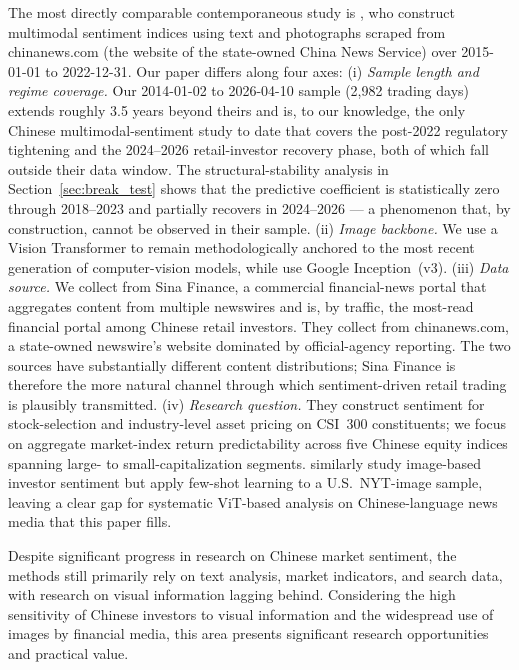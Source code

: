 \documentclass[AER]{AEA}
\begin{document}
The most directly comparable contemporaneous study is \citet{zhang2025multimodal}, who construct multimodal sentiment indices using text and photographs scraped from chinanews.com (the website of the state-owned China News Service) over 2015-01-01 to 2022-12-31. Our paper differs along four axes:
(i) \emph{Sample length and regime coverage.} Our 2014-01-02 to 2026-04-10 sample (2{,}982 trading days) extends roughly 3.5 years beyond theirs and is, to our knowledge, the only Chinese multimodal-sentiment study to date that covers the post-2022 regulatory tightening and the 2024--2026 retail-investor recovery phase, both of which fall outside their data window. The structural-stability analysis in Section~\ref{sec:break_test} shows that the predictive coefficient is statistically zero through 2018--2023 and partially recovers in 2024--2026 --- a phenomenon that, by construction, cannot be observed in their sample.
(ii) \emph{Image backbone.} We use a Vision Transformer to remain methodologically anchored to the most recent generation of computer-vision models, while \citet{zhang2025multimodal} use Google Inception~(v3).
(iii) \emph{Data source.} We collect from Sina Finance, a commercial financial-news portal that aggregates content from multiple newswires and is, by traffic, the most-read financial portal among Chinese retail investors. They collect from chinanews.com, a state-owned newswire's website dominated by official-agency reporting. The two sources have substantially different content distributions; Sina Finance is therefore the more natural channel through which sentiment-driven retail trading is plausibly transmitted.
(iv) \emph{Research question.} They construct sentiment for stock-selection and industry-level asset pricing on CSI~300 constituents; we focus on aggregate market-index return predictability across five Chinese equity indices spanning large- to small-capitalization segments.
\citet{ren2025investor} similarly study image-based investor sentiment but apply few-shot learning to a U.S.\ NYT-image sample, leaving a clear gap for systematic ViT-based analysis on Chinese-language news media that this paper fills.

Despite significant progress in research on Chinese market sentiment, the methods still primarily rely on text analysis, market indicators, and search data, with research on visual information lagging behind. Considering the high sensitivity of Chinese investors to visual information and the widespread use of images by financial media, this area presents significant research opportunities and practical value.
\end{document}
